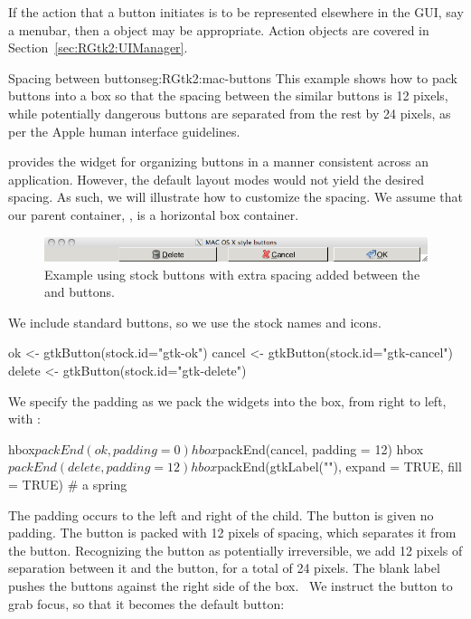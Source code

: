 If the action that a button initiates is to be represented elsewhere
in the GUI, say a menubar, then a  object may be
appropriate. Action objects are covered in
Section~\ref{sec:RGtk2:UIManager}.

\begin{example}{Spacing between buttons}{eg:RGtk2:mac-buttons}
This example shows how to pack buttons into a box so that the spacing
between the similar buttons is 12 pixels, while potentially dangerous
buttons are separated from the rest by 24 pixels, as per the Apple human
interface guidelines.  

\GTK\/ provides the widget  for organizing
buttons in a manner consistent across an application. However, the
default layout modes would not yield the desired spacing. As such, we
will illustrate how to customize the spacing.  We assume that our
parent container, , is a horizontal box container.


\begin{figure}
  \centering
  \includegraphics[width=.85\textwidth]{ex-RGtk2-mac-buttons}
  \caption{Example using stock buttons with extra spacing added between the  and  buttons.}
  \label{fig:ex-RGtk2-mac-buttons}
\end{figure}

We include standard buttons, so we use the stock names and icons.
\begin{Schunk}
\begin{Sinput}
 ok <- gtkButton(stock.id="gtk-ok")
 cancel <- gtkButton(stock.id="gtk-cancel")
 delete <- gtkButton(stock.id="gtk-delete")
\end{Sinput}
\end{Schunk}

We specify the padding as we pack the widgets into the box, from right
to left, with :
\begin{Schunk}
\begin{Sinput}
 hbox$packEnd(ok, padding = 0)
 hbox$packEnd(cancel, padding = 12)
 hbox$packEnd(delete, padding = 12)
 hbox$packEnd(gtkLabel(""), expand = TRUE, fill = TRUE) # a spring
\end{Sinput}
\end{Schunk}
%
The padding occurs to the left and right of the child.  The 
button is given no padding. The  button is packed with 12
pixels of spacing, which separates it from the 
button. Recognizing the  button as potentially
irreversible, we add 12 pixels of separation between it and the
 button, for a total of 24 pixels. The blank label pushes
the buttons against the right side of the box.~  We instruct the
 button to grab focus, so that it becomes the default
button:
\begin{Schunk}
\end{Schunk}







\end{example}
